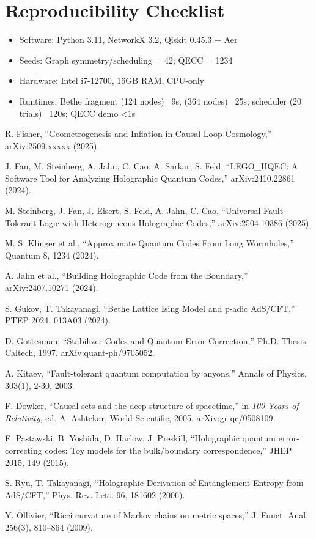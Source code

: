 \documentclass[11pt, a4paper]{article}
\begin{document}
\section*{Reproducibility Checklist}
\begin{itemize}
  \item Software: Python 3.11, NetworkX 3.2, Qiskit 0.45.3 + Aer
  \item Seeds: Graph symmetry/scheduling = 42; QECC = 1234
  \item Hardware: Intel i7-12700, 16GB RAM, CPU-only
  \item Runtimes: Bethe fragment (124 nodes) ~9s, (364 nodes) ~25s; scheduler (20 trials) ~120s; QECC demo <1s
\end{itemize}

\begin{thebibliography}{99}
R. Fisher, ``Geometrogenesis and Inflation in Causal Loop Cosmology,'' arXiv:2509.xxxxx (2025).

J. Fan, M. Steinberg, A. Jahn, C. Cao, A. Sarkar, S. Feld, ``LEGO\_HQEC: A Software Tool for Analyzing Holographic Quantum Codes,'' arXiv:2410.22861 (2024).

M. Steinberg, J. Fan, J. Eisert, S. Feld, A. Jahn, C. Cao, ``Universal Fault-Tolerant Logic with Heterogeneous Holographic Codes,'' arXiv:2504.10386 (2025).

M. S. Klinger et al., ``Approximate Quantum Codes From Long Wormholes,'' Quantum 8, 1234 (2024).

A. Jahn et al., ``Building Holographic Code from the Boundary,'' arXiv:2407.10271 (2024).

S. Gukov, T. Takayanagi, ``Bethe Lattice Ising Model and p-adic AdS/CFT,'' PTEP 2024, 013A03 (2024).

D. Gottesman, ``Stabilizer Codes and Quantum Error Correction,'' Ph.D. Thesis, Caltech, 1997. arXiv:quant-ph/9705052.

A. Kitaev, ``Fault-tolerant quantum computation by anyons,'' Annals of Physics, 303(1), 2-30, 2003.

F. Dowker, ``Causal sets and the deep structure of spacetime,'' in \textit{100 Years of Relativity}, ed. A. Ashtekar, World Scientific, 2005. arXiv:gr-qc/0508109.

F. Pastawski, B. Yoshida, D. Harlow, J. Preskill, ``Holographic quantum error-correcting codes: Toy models for the bulk/boundary correspondence,'' JHEP 2015, 149 (2015).

S. Ryu, T. Takayanagi, ``Holographic Derivation of Entanglement Entropy from AdS/CFT,'' Phys. Rev. Lett. 96, 181602 (2006).

Y. Ollivier, ``Ricci curvature of Markov chains on metric spaces,'' J. Funct. Anal. 256(3), 810–864 (2009).
\end{thebibliography}
\end{document}
